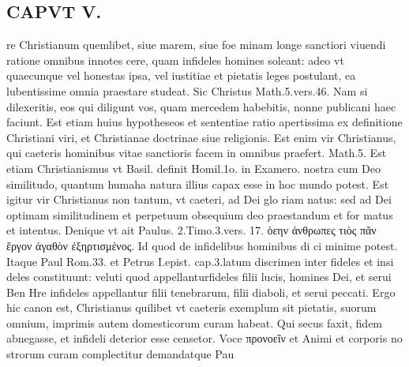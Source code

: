 \documentclass{article}
\begin{document}
\begin{pages}
\section*{CAPVT  V. }
\marginpar{[ p.265 ]}\pstart re Christianum quemlibet, siue marem, siue foe minam longe sanctiori viuendi ratione omnibus innotes cere, quam infideles homines soleant: adeo vt quaecunque vel honestas ipsa, vel iustitiae et pietatis leges postulant, ea lubentissime omnia praestare studeat. Sic Christus Math.5.vers.46. Nam si dilexeritis, eos qui diligunt vos, quam mercedem habebitis, nonne publicani haec faciunt. Est etiam huius hypotheseos et sententiae ratio apertissima ex definitione Christiani viri, et Christianae doctrinae siue religionis. Est enim vir Christianus, qui caeteris hominibus vitae sanctioris facem in omnibus praefert. Math.5. Est etiam Christianismus vt Basil. definit Homil.1o. in Examero. nostra cum Deo similitudo, quantum humaha natura illius capax esse in hoc mundo potest. Est igitur vir Christianus non tantum, vt caeteri, ad Dei glo riam natus: sed ad Dei optimam similitudinem et perpetuum obsequium deo praestandum et for matus et intentus. Denique vt ait Paulus. 2.Timo.3.vers. 17. ὁεην ἀνθρωπες τιὸς πᾶν ἔργον ἀγαθὸν ἐξηρτισμένος. Id quod de infidelibus hominibus di ci minime potest. Itaque Paul Rom.33. et Petrus I.epist. cap.3.latum discrimen inter fideles et insi deles constituunt: veluti quod appellanturfideles filii lucis, homines Dei, et serui Ben Hre infideles appellantur filii tenebrarum, filii diaboli, et serui peccati. Ergo hic canon est, Christianus quilibet vt caeteris exemplum sit pietatis, suorum omnium, imprimis autem domesticorum curam habeat. Qui secus faxit, fidem abnegasse, et infideli deterior esse censetor. Voce προνοεῖν et Animi et corporis no strorum curam complectitur demandatque Pau  \pend

\end{pages}
\end{document}
